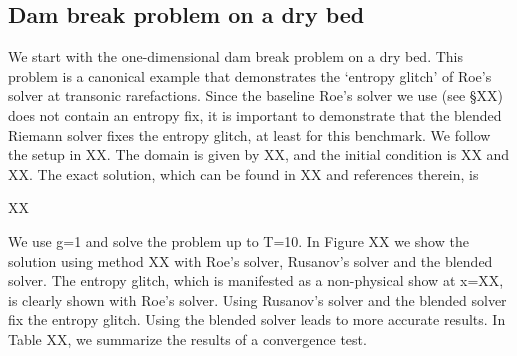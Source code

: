 \documentclass[preprint, 11pt]{article}
\begin{document}
\subsection{Dam break problem on a dry bed}
We start with the one-dimensional dam break problem on a dry bed. 
This problem is a canonical example that demonstrates the `entropy glitch' of Roe's solver 
at transonic rarefactions. Since the baseline Roe's solver we use (see \S XX) does not contain 
an entropy fix, it is important to demonstrate that the blended Riemann solver fixes the entropy glitch, 
at least for this benchmark. 
We follow the setup in XX. The domain is given by XX, and the initial condition is XX and XX. 
The exact solution, which can be found in XX and references therein, is 

XX 

We use g=1 and solve the problem up to T=10. In Figure XX we show the solution using method XX 
with Roe's solver, Rusanov's solver and the blended solver. The entropy glitch, which is manifested 
as a non-physical show at x=XX, is clearly shown with Roe's solver. Using Rusanov's solver and the 
blended solver fix the entropy glitch. Using the blended solver leads to more accurate results. 
In Table XX, we summarize the results of a convergence test. 
\end{document}

